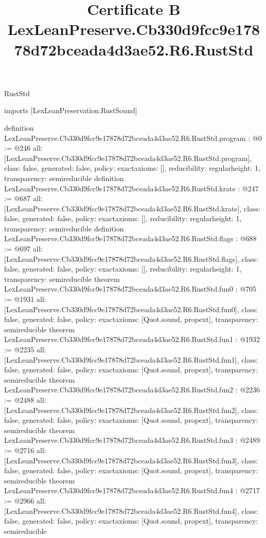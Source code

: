 \begin{lexlean}{RustStd}
\title{Certificate B LexLeanPreserve.Cb330d9fcc9e17878d72bceada4d3ae52.R6.RustStd}
\begin{coremodule}
imports [LexLeanPreservation.RustSound]

definition LexLeanPreserve.Cb330d9fcc9e17878d72bceada4d3ae52.R6.RustStd.program : @0 := @246 {
  all: [LexLeanPreserve.Cb330d9fcc9e17878d72bceada4d3ae52.R6.RustStd.program],
  class: false,
  generated: false,
  policy: exact{axioms: []},
  reducibility: regular{height: 1},
  transparency: semireducible
}
definition LexLeanPreserve.Cb330d9fcc9e17878d72bceada4d3ae52.R6.RustStd.krate : @247 := @687 {
  all: [LexLeanPreserve.Cb330d9fcc9e17878d72bceada4d3ae52.R6.RustStd.krate],
  class: false,
  generated: false,
  policy: exact{axioms: []},
  reducibility: regular{height: 1},
  transparency: semireducible
}
definition LexLeanPreserve.Cb330d9fcc9e17878d72bceada4d3ae52.R6.RustStd.flags : @688 := @697 {
  all: [LexLeanPreserve.Cb330d9fcc9e17878d72bceada4d3ae52.R6.RustStd.flags],
  class: false,
  generated: false,
  policy: exact{axioms: []},
  reducibility: regular{height: 1},
  transparency: semireducible
}
theorem LexLeanPreserve.Cb330d9fcc9e17878d72bceada4d3ae52.R6.RustStd.fun0 : @705 := @1931 {
  all: [LexLeanPreserve.Cb330d9fcc9e17878d72bceada4d3ae52.R6.RustStd.fun0],
  class: false,
  generated: false,
  policy: exact{axioms: [Quot.sound, propext]},
  transparency: semireducible
}
theorem LexLeanPreserve.Cb330d9fcc9e17878d72bceada4d3ae52.R6.RustStd.fun1 : @1932 := @2235 {
  all: [LexLeanPreserve.Cb330d9fcc9e17878d72bceada4d3ae52.R6.RustStd.fun1],
  class: false,
  generated: false,
  policy: exact{axioms: [Quot.sound, propext]},
  transparency: semireducible
}
theorem LexLeanPreserve.Cb330d9fcc9e17878d72bceada4d3ae52.R6.RustStd.fun2 : @2236 := @2488 {
  all: [LexLeanPreserve.Cb330d9fcc9e17878d72bceada4d3ae52.R6.RustStd.fun2],
  class: false,
  generated: false,
  policy: exact{axioms: [Quot.sound, propext]},
  transparency: semireducible
}
theorem LexLeanPreserve.Cb330d9fcc9e17878d72bceada4d3ae52.R6.RustStd.fun3 : @2489 := @2716 {
  all: [LexLeanPreserve.Cb330d9fcc9e17878d72bceada4d3ae52.R6.RustStd.fun3],
  class: false,
  generated: false,
  policy: exact{axioms: [Quot.sound, propext]},
  transparency: semireducible
}
theorem LexLeanPreserve.Cb330d9fcc9e17878d72bceada4d3ae52.R6.RustStd.fun4 : @2717 := @2966 {
  all: [LexLeanPreserve.Cb330d9fcc9e17878d72bceada4d3ae52.R6.RustStd.fun4],
  class: false,
  generated: false,
  policy: exact{axioms: [Quot.sound, propext]},
  transparency: semireducible
}
\end{coremodule}
\end{lexlean}
